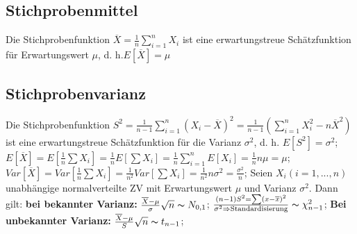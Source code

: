 \subsection{Stichprobenmittel}
Die Stichprobenfunktion $ \overline{X} = \frac{1}{n} \sum_{i=1}^{n} X_{i} $ ist eine erwartungstreue Schätzfunktion für Erwartungswert $ \mu $, d. h.$E[\overline{X}] = \mu$
\subsection{Stichprobenvarianz}
Die Stichprobenfunktion $ S^2 = \frac{1}{n-1} \sum_{i=1}^{n} (X_{i} - \overline{X})^2 = \frac{1}{n-1}(\sum_{i=1}^{n}X_{i}^2 - n\overline{X}^2)$ist eine erwartungstreue Schätzfunktion für die Varianz $\sigma^2$, d. h. $E[S^2] =\sigma^2$; 
$ E[\overline{X}] = E[\frac{1}{n}\sum X_{i}] = \frac{1}{n} E[\sum X_{i}] = \frac{1}{n} \sum_{i=1}^{n} E[X_{i}] = \frac{1}{n} n\mu = \mu$; 
$ Var[\overline{X}] = Var[\frac{1}{n}\sum X_{i}] = \frac{1}{n^2} Var[\sum X_{i}] = \frac{1}{n^2}n\sigma^2 = \frac{\sigma^2}{n} $; 
Seien $ X_{i} (i=1, ..., n)$ unabhängige normalverteilte ZV mit Erwartungswert $\mu$ und Varianz $\sigma^2$. Dann gilt:
\textbf{bei bekannter Varianz:} $ \frac{\overline{X} -\mu}{\sigma} \sqrt{n} \thicksim N_{0,1}$; 
$ \frac{(n-1)S^2 = \sum(x-\overline{x})^2}{\sigma^2 \Rightarrow \text{Standardisierung}} \thicksim \chi_{n-1}^{2}$; 
\textbf{Bei unbekannter Varianz:} $ \frac{\overline{X}-\mu}{S}\sqrt{n} \thicksim t_{n-1}$; 